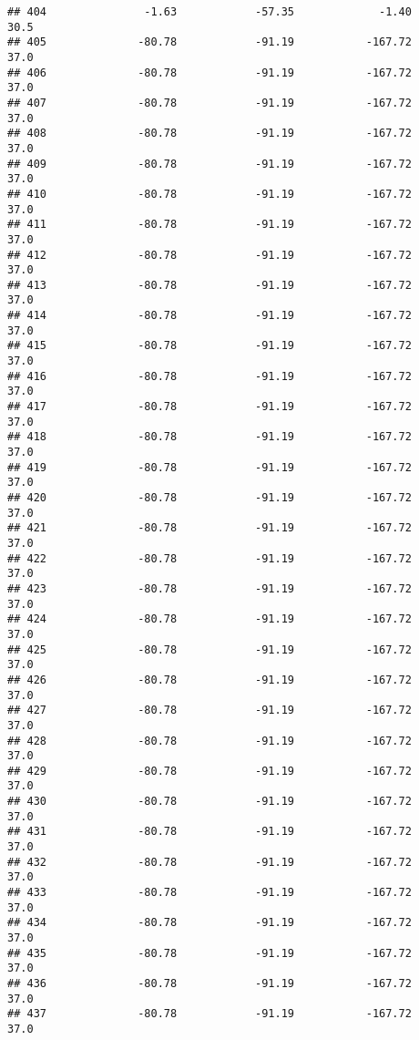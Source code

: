\documentclass[]{article}
\begin{document}
\begin{verbatim}
## 404               -1.63            -57.35             -1.40           30.5
## 405              -80.78            -91.19           -167.72           37.0
## 406              -80.78            -91.19           -167.72           37.0
## 407              -80.78            -91.19           -167.72           37.0
## 408              -80.78            -91.19           -167.72           37.0
## 409              -80.78            -91.19           -167.72           37.0
## 410              -80.78            -91.19           -167.72           37.0
## 411              -80.78            -91.19           -167.72           37.0
## 412              -80.78            -91.19           -167.72           37.0
## 413              -80.78            -91.19           -167.72           37.0
## 414              -80.78            -91.19           -167.72           37.0
## 415              -80.78            -91.19           -167.72           37.0
## 416              -80.78            -91.19           -167.72           37.0
## 417              -80.78            -91.19           -167.72           37.0
## 418              -80.78            -91.19           -167.72           37.0
## 419              -80.78            -91.19           -167.72           37.0
## 420              -80.78            -91.19           -167.72           37.0
## 421              -80.78            -91.19           -167.72           37.0
## 422              -80.78            -91.19           -167.72           37.0
## 423              -80.78            -91.19           -167.72           37.0
## 424              -80.78            -91.19           -167.72           37.0
## 425              -80.78            -91.19           -167.72           37.0
## 426              -80.78            -91.19           -167.72           37.0
## 427              -80.78            -91.19           -167.72           37.0
## 428              -80.78            -91.19           -167.72           37.0
## 429              -80.78            -91.19           -167.72           37.0
## 430              -80.78            -91.19           -167.72           37.0
## 431              -80.78            -91.19           -167.72           37.0
## 432              -80.78            -91.19           -167.72           37.0
## 433              -80.78            -91.19           -167.72           37.0
## 434              -80.78            -91.19           -167.72           37.0
## 435              -80.78            -91.19           -167.72           37.0
## 436              -80.78            -91.19           -167.72           37.0
## 437              -80.78            -91.19           -167.72           37.0

\end{verbatim}
\end{document}
